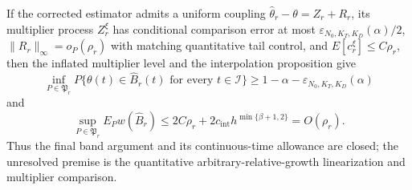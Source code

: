 If the corrected estimator admits a uniform coupling \(\widehat\theta_r-\theta=Z_r+R_r\), its multiplier process \(Z_r^\xi\) has conditional comparison error at most \(\varepsilon_{N_0,K_T,K_D}(\alpha)/2\), \(\|R_r\|_\infty=o_P(\rho_r)\) with matching quantitative tail control, and \(E[c_r^\xi]\le C\rho_r\), then the inflated multiplier level and the interpolation proposition give
\[
 \inf_{P\in\mathfrak P_r}P\{\theta(t)\in\widehat B_r(t)
 \text{ for every }t\in\mathcal I\}
 \ge1-\alpha-\varepsilon_{N_0,K_T,K_D}(\alpha)
\]
and
\[
 \sup_{P\in\mathfrak P_r}E_Pw(\widehat B_r)
 \le2C\rho_r+2c_{\mathrm{int}}h^{\min\{\beta+1,2\}}=O(\rho_r).
\]
Thus the final band argument and its continuous-time allowance are closed; the unresolved premise is the quantitative arbitrary-relative-growth linearization and multiplier comparison.